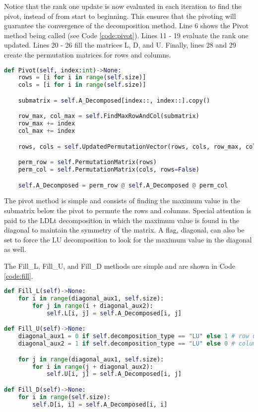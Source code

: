 Notice that the rank one update is now evaluated in each iteration to find the pivot, instead of from start to beginning. This ensures that the pivoting will guarantee the convergence of the decomposition method. Line 6 shows the Pivot method being called (see Code \ref{code:pivot}). Lines 11 - 19 evaluate the rank one updated. Lines 20 - 26 fill the matrices L, D, and U. Finally, lines 28 and 29 create the permutation matrices for rows and columns. 
\begin{lstlisting}[language=Python, caption={Pivot method.}, label={code:pivot}]
def Pivot(self, index:int)->None:
    rows = [i for i in range(self.size)]
    cols = [i for i in range(self.size)]

    submatrix = self.A_Decomposed[index::, index::].copy()

    row_max, col_max = self.FindMaxRowAndCol(submatrix)
    row_max += index
    col_max += index

    rows, cols = self.UpdatedPermutationVector(rows, cols, row_max, col_max, index)

    perm_row = self.PermutationMatrix(rows)
    perm_col = self.PermutationMatrix(cols, rows=False)

    self.A_Decomposed = perm_row @ self.A_Decomposed @ perm_col
\end{lstlisting}
The pivot method is simple and consists of finding the maximum value in the submatrix below the pivot to permute the rows and columns. Special attention is paid to the LDLt decomposition in which the maximum value is found in the diagonal to maintain the symmetry of the matrix. A flag, diagonal, can also be set to force the LU decomposition to look for the maximum value in the diagonal as well.

The Fill\_L, Fill\_U, and Fill\_D methods are simple and are shown in Code \ref{code:fill}.
\begin{lstlisting}[language=Python, caption={Fill\_L, Fill\_U, and Fill\_D methods.}, label={code:fill}]
def Fill_L(self)->None:
    for i in range(diagonal_aux1, self.size):
        for j in range(i + diagonal_aux2):
            self.L[i, j] = self.A_Decomposed[i, j]

def Fill_U(self)->None:
    diagonal_aux1 = 0 if self.decomposition_type == "LU" else 1 # row used to start filling the matrix
    diagonal_aux2 = 1 if self.decomposition_type == "LU" else 0 # column used to start filling the matrix

    for j in range(diagonal_aux1, self.size):
        for i in range(j + diagonal_aux2):
            self.U[i, j] = self.A_Decomposed[i, j]

def Fill_D(self)->None:
    for i in range(self.size):
        self.D[i, i] = self.A_Decomposed[i, i]
\end{lstlisting}

